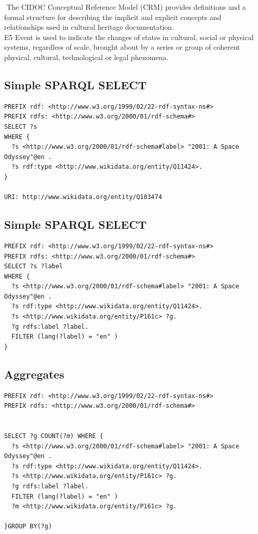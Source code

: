 \documentclass{article}
\begin{document}
$ $
The CIDOC Conceptual Reference Model (CRM) provides definitions and a formal structure for describing the implicit and explicit concepts and relationships used in cultural heritage documentation. \\
E5 Event is used to indicate the changes of states in cultural, social or physical systems, regardless of scale, brought about by a series or group of coherent physical, cultural, technological or legal phenomena.\\


\subsection{Simple SPARQL SELECT}
\begin{verbatim}
PREFIX rdf: <http://www.w3.org/1999/02/22-rdf-syntax-ns#>
PREFIX rdfs: <http://www.w3.org/2000/01/rdf-schema#>
SELECT ?s
WHERE {
  ?s <http://www.w3.org/2000/01/rdf-schema#label> "2001: A Space Odyssey"@en .
  ?s rdf:type <http://www.wikidata.org/entity/Q11424>.
}

URI: http://www.wikidata.org/entity/Q103474
\end{verbatim}



\subsection{Simple SPARQL SELECT}

\begin{verbatim}
PREFIX rdf: <http://www.w3.org/1999/02/22-rdf-syntax-ns#>
PREFIX rdfs: <http://www.w3.org/2000/01/rdf-schema#>
SELECT ?s ?label
WHERE {
  ?s <http://www.w3.org/2000/01/rdf-schema#label> "2001: A Space Odyssey"@en .
  ?s rdf:type <http://www.wikidata.org/entity/Q11424>.
  ?s <http://www.wikidata.org/entity/P161c> ?g.
  ?g rdfs:label ?label.
  FILTER (lang(?label) = "en" )
}
\end{verbatim}

\subsection{Aggregates}
\begin{verbatim}
PREFIX rdf: <http://www.w3.org/1999/02/22-rdf-syntax-ns#>
PREFIX rdfs: <http://www.w3.org/2000/01/rdf-schema#>


SELECT ?g COUNT(?m) WHERE {
  ?s <http://www.w3.org/2000/01/rdf-schema#label> "2001: A Space Odyssey"@en .
  ?s rdf:type <http://www.wikidata.org/entity/Q11424>.
  ?s <http://www.wikidata.org/entity/P161c> ?g.
  ?g rdfs:label ?label.
  FILTER (lang(?label) = "en" )
  ?m <http://www.wikidata.org/entity/P161c> ?g.

}GROUP BY(?g)
\end{verbatim}
\end{document}
